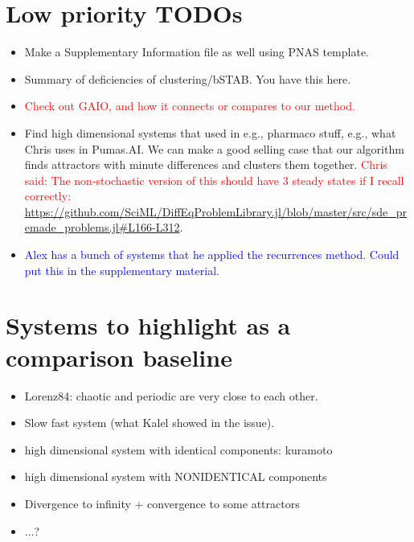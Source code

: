 \documentclass{article}
\newcommand{\george}[1]{\textcolor{red}{#1}}
\newcommand{\alex}[1]{\textcolor{blue}{#1}}
\newcommand{\kalel}[1]{\textcolor{OliveGreen}{#1}}
\begin{document}
\section{Low priority TODOs}
\begin{itemize}
    \item Make a Supplementary Information file as well using PNAS template.
    \item \kalel{Summary of deficiencies of clustering/bSTAB. You have this here.}
    \item \george{Check out GAIO, and how it connects or compares to our method.}
    \item Find high dimensional systems that used in e.g., pharmaco stuff, e.g., what Chris uses in Pumas.AI. We can make a good selling case that our algorithm finds attractors with minute differences and clusters them together.  \george{Chris said: The non-stochastic version of this should have 3 steady states if I recall correctly: \url{https://github.com/SciML/DiffEqProblemLibrary.jl/blob/master/src/sde_premade_problems.jl#L166-L312}}.
    \item \alex{Alex has a bunch of systems that he applied the recurrences method. Could put this in the supplementary material.}
\end{itemize}

\section{Systems to highlight as a comparison baseline}

\begin{itemize}
    \item Lorenz84: chaotic and periodic are very close to each other.
    \item Slow fast system (what Kalel showed in the issue).
    \item high dimensional system with identical components: kuramoto
    \item high dimensional system with NONIDENTICAL components
    \item Divergence to infinity + convergence to some attractors
    \item ...?
\end{itemize}
\end{document}

